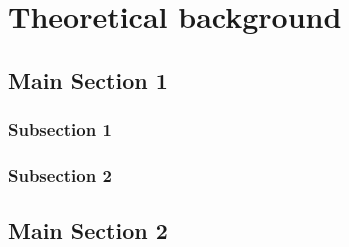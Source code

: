 
\chapter{Theoretical background} %

\label{Chapter2} %


\section{Main Section 1}
\lipsum[1-1]

\subsection{Subsection 1}
\lipsum[1-1]

\subsection{Subsection 2}
\lipsum[1-1]

\section{Main Section 2}
\lipsum[1-1]